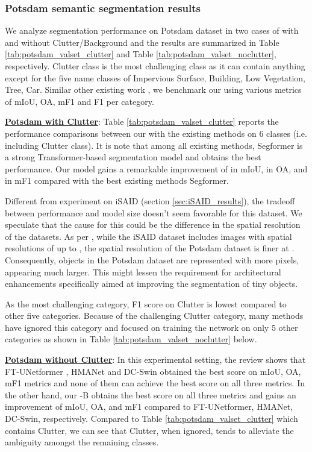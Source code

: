 \documentclass[journal]{IEEEtran}
\begin{document}
\subsubsection{\textbf{Potsdam semantic segmentation results}}
\label{sec:Potsdam_results}
We analyze segmentation performance on Potsdam dataset in two cases of with and without Clutter/Background and the results are summarized in Table \ref{tab:potsdam_valset_clutter} and Table \ref{tab:potsdam_valset_noclutter}, respectively. Clutter class is the most challenging class as it can contain anything except for the five name classes of Impervious Surface, Building, Low Vegetation, Tree, Car. Similar other existing work \cite{li2020scattnet, sun2022ringmo, wang2022unetformer}, we benchmark our \model using various metrics of mIoU, OA, mF1 and F1 per category. 


\noindent
\underline{\textbf{Potsdam with Clutter}}:
Table \ref{tab:potsdam_valset_clutter} reports the performance comparisons between our \model with the existing methods on 6 classes (i.e. including Clutter class). It is note that among all existing methods, Segformer \cite{xie2021segformer} is a strong Transformer-based segmentation model and obtains the best performance. Our model gains a remarkable improvement of  in mIoU,  in OA, and  in mF1 compared with the best existing methods Segformer. 

Different from experiment on iSAID (section \ref{sec:iSAID_results}), the tradeoff between performance and model size doesn't seem favorable for this dataset. We speculate that the cause for this could be the difference in the spatial resolution of the datasets. As per \cite{long2021creating}, while the iSAID dataset includes images with spatial resolutions of up to  , the spatial resolution of the Potsdam dataset is finer at  . Consequently, objects in the Potsdam dataset are represented with more pixels, appearing much larger. This might lessen the requirement for architectural enhancements specifically aimed at improving the segmentation of tiny objects. 

As the most challenging category, F1 score on Clutter is lowest compared to other five categories. Because of the challenging Clutter category, many methods have ignored this category and focused on training the network on only 5 other categories as shown in Table \ref{tab:potsdam_valset_noclutter} below. 



\noindent
\underline{\textbf{Potsdam without Clutter}}:
In this experimental setting, the review shows that FT-UNetformer \cite{wang2022unetformer}, HMANet \cite{niu2021hybrid} and DC-Swin \cite{wang2022novel} obtained the best score on mIoU, OA, mF1 metrics and none of them can achieve the best score on all three metrics. In the other hand, our \model-B obtains the best score on all three metrics and gains an improvement of  mIoU,  OA, and  mF1 compared to FT-UNetformer, HMANet, DC-Swin, respectively. Compared to Table \ref{tab:potsdam_valset_clutter} which contains Clutter, we can see that Clutter, when ignored, tends to alleviate the ambiguity amongst the remaining classes. 
\end{document}
